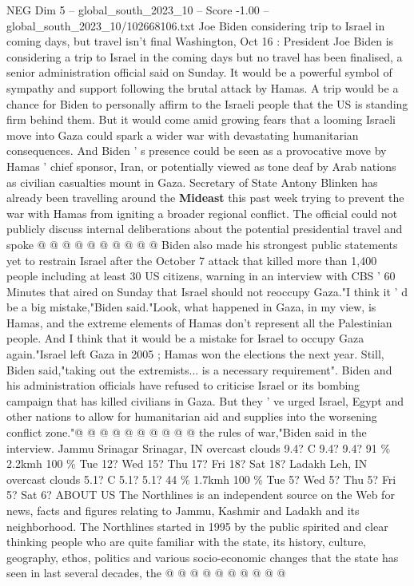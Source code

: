 \begin{textsample}{NEG Dim 5 – global\_south\_2023\_10 – Score -1.00 – global\_south\_2023\_10/102668106.txt}  \label{ex:f5_neg_094}
Joe Biden considering trip to Israel in coming days, but travel isn't final Washington, Oct 16 : President Joe Biden is considering a trip to Israel in the coming days but no travel has been finalised, a senior administration official said on Sunday.
It would be a powerful symbol of sympathy and support following the brutal attack by Hamas.
A trip would be a chance for Biden to personally affirm to the Israeli people that the US is standing firm behind them.
But it would come amid growing fears that a looming Israeli move into Gaza could spark a wider war with devastating humanitarian consequences.
And Biden ' s presence could be seen as a provocative move by Hamas ' chief sponsor, Iran, or potentially viewed as tone deaf by Arab nations as civilian casualties mount in Gaza.
Secretary of State Antony Blinken has already been travelling around the \textbf{Mideast} this past week trying to prevent the war with Hamas from igniting a broader regional conflict.
The official could not publicly discuss internal deliberations about the potential presidential travel and spoke @ @ @ @ @ @ @ @ @ @ Biden also made his strongest public statements yet to restrain Israel after the October 7 attack that killed more than 1,400 people including at least 30 US citizens, warning in an interview with CBS ' 60 Minutes that aired on Sunday that Israel should not reoccupy Gaza."I think it ' d be a big mistake,"Biden said."Look, what happened in Gaza, in my view, is Hamas, and the extreme elements of Hamas don't represent all the Palestinian people.
And I think that it would be a mistake for Israel to occupy Gaza again."Israel left Gaza in 2005 ; Hamas won the elections the next year.
Still, Biden said,"taking out the extremists... is a necessary requirement".
Biden and his administration officials have refused to criticise Israel or its bombing campaign that has killed civilians in Gaza.
But they ' ve urged Israel, Egypt and other nations to allow for humanitarian aid and supplies into the worsening conflict zone."@ @ @ @ @ @ @ @ @ @ the rules of war,"Biden said in the interview.
Jammu Srinagar Srinagar, IN overcast clouds 9.4?
C 9.4? 9.4? 91 \% 2.2kmh 100 \% Tue 12?
Wed 15?
Thu 17?
Fri 18?
Sat 18?
Ladakh Leh, IN overcast clouds 5.1?
C 5.1? 5.1? 44 \% 1.7kmh 100 \% Tue 5?
Wed 5?
Thu 5?
Fri 5?
Sat 6?
ABOUT US The Northlines is an independent source on the Web for news, facts and figures relating to Jammu, Kashmir and Ladakh and its neighborhood.
The Northlines started in 1995 by the public spirited and clear thinking people who are quite familiar with the state, its history, culture, geography, ethos, politics and various socio-economic changes that the state has seen in last several decades, the @ @ @ @ @ @ @ @ @ @

\end{textsample}
